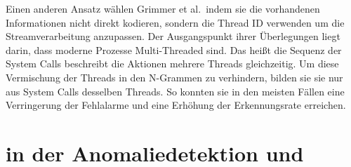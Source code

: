        Einen anderen Ansatz wählen Grimmer et al.\ indem sie die vorhandenen Informationen nicht direkt kodieren, sondern die Thread ID verwenden um die Streamverarbeitung anzupassen.
        Der Ausgangspunkt ihrer Überlegungen liegt darin, dass moderne Prozesse Multi-Threaded sind.
        Das heißt die Sequenz der System Calls beschreibt die Aktionen mehrere Threads gleichzeitig.
        Um diese Vermischung der Threads in den N-Grammen zu verhindern, bilden sie sie nur aus System Calls desselben Threads.
        So konnten sie in den meisten Fällen eine Verringerung der Fehlalarme und eine Erhöhung der Erkennungsrate erreichen.\cite{IDSTHREADGRIMMER2021}

        

        \section{ in der Anomaliedetektion und }\label{sec:related_nlp}

